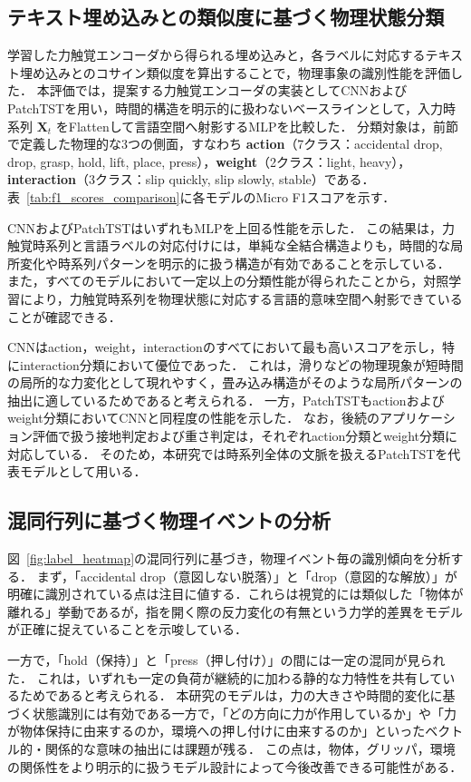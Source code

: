 \documentclass[Japanese]{dicomopapers}
\begin{document}
\subsection{テキスト埋め込みとの類似度に基づく物理状態分類}
\label{subsec:classification}
学習した力触覚エンコーダから得られる埋め込みと，各ラベルに対応するテキスト埋め込みとのコサイン類似度を算出することで，物理事象の識別性能を評価した．
本評価では，提案する力触覚エンコーダの実装としてCNNおよびPatchTSTを用い，時間的構造を明示的に扱わないベースラインとして，入力時系列 $\mathbf{X}_t$ をFlattenして言語空間へ射影するMLPを比較した．
分類対象は，前節で定義した物理的な3つの側面，すなわち \textbf{action}（7クラス：accidental drop, drop, grasp, hold, lift, place, press），\textbf{weight}（2クラス：light, heavy），\textbf{interaction}（3クラス：slip quickly, slip slowly, stable）である．表~\ref{tab:f1_scores_comparison}に各モデルのMicro F1スコアを示す．

CNNおよびPatchTSTはいずれもMLPを上回る性能を示した．
この結果は，力触覚時系列と言語ラベルの対応付けには，単純な全結合構造よりも，時間的な局所変化や時系列パターンを明示的に扱う構造が有効であることを示している．
また，すべてのモデルにおいて一定以上の分類性能が得られたことから，対照学習により，力触覚時系列を物理状態に対応する言語的意味空間へ射影できていることが確認できる．

CNNはaction，weight，interactionのすべてにおいて最も高いスコアを示し，特にinteraction分類において優位であった．
これは，滑りなどの物理現象が短時間の局所的な力変化として現れやすく，畳み込み構造がそのような局所パターンの抽出に適しているためであると考えられる．
一方，PatchTSTもactionおよびweight分類においてCNNと同程度の性能を示した．
なお，後続のアプリケーション評価で扱う接地判定および重さ判定は，それぞれaction分類とweight分類に対応している．
そのため，本研究では時系列全体の文脈を扱えるPatchTSTを代表モデルとして用いる．

\subsection{混同行列に基づく物理イベントの分析}
\label{subsec:heatmap}
図~\ref{fig:label_heatmap}の混同行列に基づき，物理イベント毎の識別傾向を分析する．
まず，「accidental drop（意図しない脱落）」と「drop（意図的な解放）」が明確に識別されている点は注目に値する．これらは視覚的には類似した「物体が離れる」挙動であるが，指を開く際の反力変化の有無という力学的差異をモデルが正確に捉えていることを示唆している．

一方で，「hold（保持）」と「press（押し付け）」の間には一定の混同が見られた．
これは，いずれも一定の負荷が継続的に加わる静的な力特性を共有しているためであると考えられる．
本研究のモデルは，力の大きさや時間的変化に基づく状態識別には有効である一方で，「どの方向に力が作用しているか」や「力が物体保持に由来するのか，環境への押し付けに由来するのか」といったベクトル的・関係的な意味の抽出には課題が残る．
この点は，物体，グリッパ，環境の関係性をより明示的に扱うモデル設計によって今後改善できる可能性がある．
\end{document}
